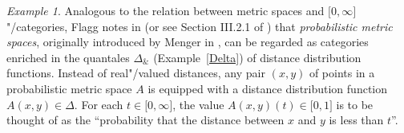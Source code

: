 \documentclass[preprint, a4paper]{elsarticle}
\theoremstyle{definition}
\theoremstyle{remark}
\newtheorem{example}[theorem]{Example}
\providecommand{\exref}[1]{Example~\ref{#1}}
\providecommand{\brks}[1]{\lbrack #1 \rbrack}
\newcommand{\tn}{\mathbin\&}
\providecommand{\2}{\mathsf 2}
\begin{document}
  \begin{example}
  	Analogous to the relation between metric spaces and $\brks{0, \infty}$"/categories, Flagg notes in \cite{Flagg97} (or see Section III.2.1 of \cite{Hofmann-Seal-Tholen14}) that \emph{probabilistic metric spaces}, originally introduced by Menger in \cite{Menger42}, can be regarded as categories enriched in the quantales $\Delta_{\tn}$ (\exref{Delta}) of distance distribution functions. Instead of real"/valued distances, any pair $(x, y)$ of points in a probabilistic metric space $A$ is equipped with a distance distribution function $A(x, y) \in \Delta$. For each $t \in \brks{0, \infty}$, the value $A(x, y)(t) \in \brks{0, 1}$ is to be thought of as the ``probability that the distance between $x$ and $y$ is less than $t$''.
  \end{example}
  
\end{document}
